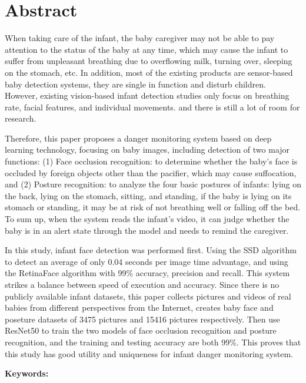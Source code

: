 \documentclass[class=NCU_thesis, crop=false]{standalone}
\begin{document}
\chapter{Abstract}
When taking care of the infant, the baby caregiver may not be able to pay attention to the status of the baby at any time, 
which may cause the infant to suffer from unpleasant breathing due to overflowing milk, turning over, sleeping on the stomach, etc. 
In addition, most of the existing products are sensor-based baby detection systems, 
they are single in function and disturb children.
However, existing vision-based infant detection studies only focus on breathing rate, facial features, and individual movements. 
and there is still a lot of room for research.

Therefore, this paper proposes a danger monitoring system based on deep learning technology, 
focusing on baby images, including detection of two major functions: 
(1) Face occlusion recognition: to determine whether the baby's face is occluded by foreign objects other than the pacifier, which may cause suffocation, 
and (2) Posture recognition: to analyze the four basic postures of infants: lying on the back, lying on the stomach, sitting, and standing, 
if the baby is lying on its stomach or standing, it may be at risk of not breathing well or falling off the bed.
To sum up, when the system reads the infant's video, it can judge whether the baby is in an alert state through the model and needs to remind the caregiver.

In this study, infant face detection was performed first.
Using the SSD algorithm to detect an average of only 0.04 seconds per image time advantage, 
and using the RetinaFace algorithm with 99\% accuracy, precision and recall. 
This system strikes a balance between speed of execution and accuracy. 
Since there is no publicly available infant datasets, 
this paper collects pictures and videos of real babies from different perspectives from the Internet, 
creates baby face and poseture datasets of 3475 pictures and 15416 pictures respectively.
Then use ResNet50 to train the two models of face occlusion recognition and posture recognition, 
and the training and testing accuracy are both 99\%.
This proves that this study has good utility and uniqueness for infant danger monitoring system.

\vspace{2em}
\noindent \textbf{Keywords:} \keywordsEn{} %
\end{document}
